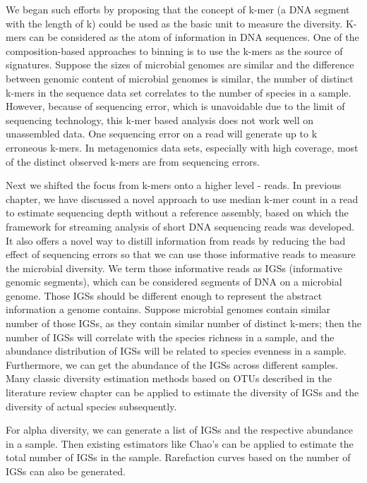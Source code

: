 We began such efforts by proposing that
 the concept of k-mer (a DNA segment with the length of k) could be used as the 
 basic unit to measure
the diversity. K-mers can be considered as the atom of information in DNA 
sequences. One of the composition-based approaches to binning is to use the 
k-mers as the source of signatures\cite{Alneberg2014, Imelfort2014}. Suppose the sizes of microbial genomes are similar and
 the difference between genomic content of microbial genomes is similar, the 
number of distinct k-mers in the sequence data set correlates to the number of 
species in a sample. However, because of sequencing error, which is unavoidable
 due to the limit of sequencing technology, this k-mer based analysis does not 
work well on unassembled data. One sequencing error on a read will generate up to  k erroneous 
k-mers. In metagenomics data sets, especially with high coverage, most of the 
distinct observed k-mers are from sequencing errors.

Next we shifted the focus from k-mers onto a higher level - reads. 
In previous chapter, we have discussed a novel approach to use median k-mer 
count in a read to estimate
sequencing depth without a reference assembly, based on which the framework for
streaming analysis of short DNA sequencing reads was developed.
It also offers a novel way to distill information from reads by reducing the
 bad effect of sequencing errors so that we can use those informative reads to 
measure the microbial diversity. We term those informative reads as 
IGSs (informative genomic segments), which can be considered segments of DNA 
on a microbial genome. Those IGSs should be different enough to represent the 
abstract information a genome contains. Suppose microbial genomes contain 
similar number of those IGSs, as they contain similar number of distinct 
k-mers; then the number of IGSs will correlate with the species richness in a 
sample, and the abundance distribution of IGSs will be related to species 
evenness in a sample. Furthermore, we can get the abundance of the IGSs across
different samples. Many classic diversity estimation methods based on OTUs 
 described in the literature review chapter can be applied to estimate 
 the diversity of IGSs 
and the diversity of actual species subsequently.


For alpha diversity, we can generate a list of IGSs and the respective 
abundance in a sample. Then existing estimators like Chao's can be applied to 
estimate the total number of IGSs in the sample. Rarefaction curves based on the
number of IGSs can also be generated. 

